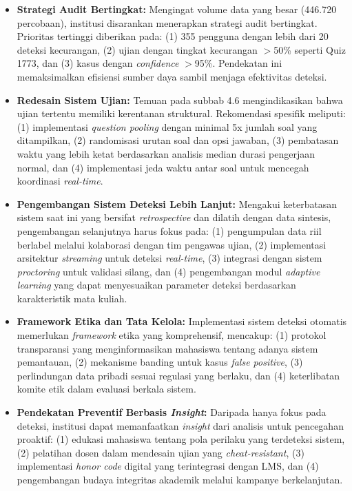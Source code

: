 \begin{itemize}
    \item \textbf{Strategi Audit Bertingkat:} Mengingat volume data yang besar (446.720 percobaan), institusi disarankan menerapkan strategi audit bertingkat. Prioritas tertinggi diberikan pada: (1) 355 pengguna dengan lebih dari 20 deteksi kecurangan, (2) ujian dengan tingkat kecurangan $>$50\% seperti Quiz 1773, dan (3) kasus dengan \textit{confidence} $>$95\%. Pendekatan ini memaksimalkan efisiensi sumber daya sambil menjaga efektivitas deteksi.
    
    \item \textbf{Redesain Sistem Ujian:} Temuan pada subbab 4.6 mengindikasikan bahwa ujian tertentu memiliki kerentanan struktural. Rekomendasi spesifik meliputi: (1) implementasi \textit{question pooling} dengan minimal 5x jumlah soal yang ditampilkan, (2) randomisasi urutan soal dan opsi jawaban, (3) pembatasan waktu yang lebih ketat berdasarkan analisis median durasi pengerjaan normal, dan (4) implementasi jeda waktu antar soal untuk mencegah koordinasi \textit{real-time}.
    
    \item \textbf{Pengembangan Sistem Deteksi Lebih Lanjut:} Mengakui keterbatasan sistem saat ini yang bersifat \textit{retrospective} dan dilatih dengan data sintesis, pengembangan selanjutnya harus fokus pada: (1) pengumpulan data riil berlabel melalui kolaborasi dengan tim pengawas ujian, (2) implementasi arsitektur \textit{streaming} untuk deteksi \textit{real-time}, (3) integrasi dengan sistem \textit{proctoring} untuk validasi silang, dan (4) pengembangan modul \textit{adaptive learning} yang dapat menyesuaikan parameter deteksi berdasarkan karakteristik mata kuliah.
    
    \item \textbf{Framework Etika dan Tata Kelola:} Implementasi sistem deteksi otomatis memerlukan \textit{framework} etika yang komprehensif, mencakup: (1) protokol transparansi yang menginformasikan mahasiswa tentang adanya sistem pemantauan, (2) mekanisme banding untuk kasus \textit{false positive}, (3) perlindungan data pribadi sesuai regulasi yang berlaku, dan (4) keterlibatan komite etik dalam evaluasi berkala sistem.
    
    \item \textbf{Pendekatan Preventif Berbasis \textit{Insight}:} Daripada hanya fokus pada deteksi, institusi dapat memanfaatkan \textit{insight} dari analisis untuk pencegahan proaktif: (1) edukasi mahasiswa tentang pola perilaku yang terdeteksi sistem, (2) pelatihan dosen dalam mendesain ujian yang \textit{cheat-resistant}, (3) implementasi \textit{honor code} digital yang terintegrasi dengan LMS, dan (4) pengembangan budaya integritas akademik melalui kampanye berkelanjutan.
\end{itemize}

